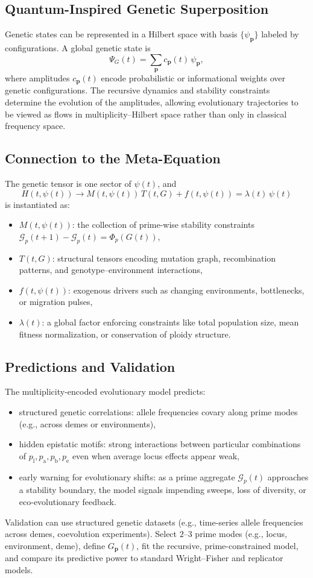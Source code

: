 \documentclass[11pt]{article}
\begin{document}
\subsection{Quantum-Inspired Genetic Superposition}
Genetic states can be represented in a Hilbert space with basis $\{\psi_{\mathbf{p}}\}$ labeled by configurations. A global genetic state is
\[
\Psi_G(t)
=
\sum_{\mathbf{p}} c_{\mathbf{p}}(t)\,\psi_{\mathbf{p}},
\]
where amplitudes $c_{\mathbf{p}}(t)$ encode probabilistic or informational weights over genetic configurations. The recursive dynamics and stability constraints determine the evolution of the amplitudes, allowing evolutionary trajectories to be viewed as flows in multiplicity--Hilbert space rather than only in classical frequency space.

\subsection{Connection to the Meta-Equation}
The genetic tensor is one sector of $\psi(t)$, and
\[
H(t,\psi(t))
\to
M(t,\psi(t))\,T(t,G)
+
f(t,\psi(t))
=
\lambda(t)\,\psi(t)
\]
is instantiated as:
\begin{itemize}
    \item $M(t,\psi(t))$: the collection of prime-wise stability constraints $\mathcal{G}_p(t+1) - \mathcal{G}_p(t) = \Phi_p(G(t))$,
    \item $T(t,G)$: structural tensors encoding mutation graph, recombination patterns, and genotype--environment interactions,
    \item $f(t,\psi(t))$: exogenous drivers such as changing environments, bottlenecks, or migration pulses,
    \item $\lambda(t)$: a global factor enforcing constraints like total population size, mean fitness normalization, or conservation of ploidy structure.
\end{itemize}

\subsection{Predictions and Validation}
The multiplicity-encoded evolutionary model predicts:
\begin{itemize}
    \item structured genetic correlations: allele frequencies covary along prime modes (e.g., across demes or environments),
    \item hidden epistatic motifs: strong interactions between particular combinations of $p_{\text{l}}, p_{\text{a}}, p_{\text{b}}, p_{\text{e}}$ even when average locus effects appear weak,
    \item early warning for evolutionary shifts: as a prime aggregate $\mathcal{G}_p(t)$ approaches a stability boundary, the model signals impending sweeps, loss of diversity, or eco-evolutionary feedback.
\end{itemize}
Validation can use structured genetic datasets (e.g., time-series allele frequencies across demes, coevolution experiments). Select $2$--$3$ prime modes (e.g., locus, environment, deme), define $G_{\mathbf{p}}(t)$, fit the recursive, prime-constrained model, and compare its predictive power to standard Wright--Fisher and replicator models.
\end{document}
